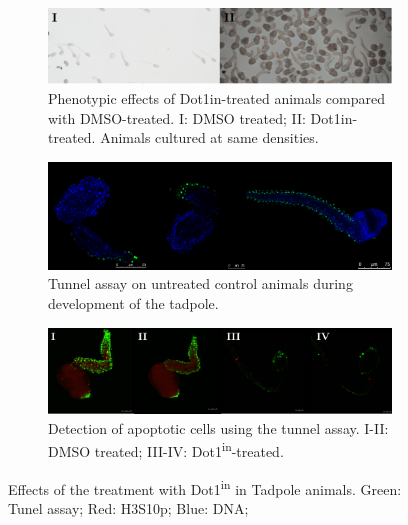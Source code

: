 \documentclass[11pt,twoside,a4paper]{report}
\begin{document}
	\begin{figure}
		\setlength{\belowcaptionskip}{5pt}
		\centering
		\begin{subfigure}{1\textwidth}
			\centering
			\includegraphics[width=1\linewidth]{pngs/tb_phenotype.png}
			\caption{Phenotypic effects of Dot1in-treated animals compared with DMSO-treated.
				{\footnotesize
					I: DMSO treated;
					II: Dot1in-treated.
					Animals cultured at same densities.
				}
			}
		\end{subfigure}
		\begin{subfigure}{1\textwidth}
			\centering
			\includegraphics[width=1\linewidth]{pngs/tb_tunnel.png}
			\caption{Tunnel assay on untreated control animals during development of the tadpole.}
		\end{subfigure}
		\begin{subfigure}{1\textwidth}
			\centering
			\includegraphics[width=1\linewidth]{pngs/tb_dot1in.png}
			\caption{
				Detection of apoptotic cells using the tunnel assay.
				{\footnotesize
					I-II: DMSO treated;
					III-IV: Dot1\textsuperscript{in}-treated.
				}
			}
		\end{subfigure}
		\caption[Effects of the treatment with Dot1\textsuperscript{in} in Tadpole animals]
		{Effects of the treatment with Dot1\textsuperscript{in} in Tadpole animals. Green: Tunel assay; Red: H3S10p; Blue: DNA;}
		\label{fig:Dot1in_TB}
	\end{figure}
	
\end{document}
